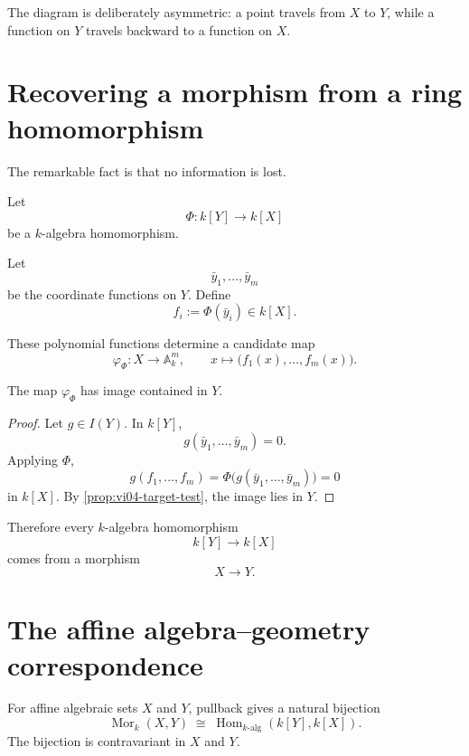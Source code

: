 \begin{center}
\end{center}

The diagram is deliberately asymmetric: a point travels from \(X\) to \(Y\), while a
function on \(Y\) travels backward to a function on \(X\).

\section{Recovering a morphism from a ring homomorphism}

The remarkable fact is that no information is lost.

Let
\[
\Phi:k[Y]\longrightarrow k[X]
\]
be a \(k\)-algebra homomorphism.

Let
\[
\bar y_1,\dots,\bar y_m
\]
be the coordinate functions on \(Y\).  Define
\[
f_i:=\Phi(\bar y_i)\in k[X].
\]

These polynomial functions determine a candidate map
\[
\varphi_\Phi:X\to\mathbb A_k^m,
\qquad
x\longmapsto
\bigl(f_1(x),\dots,f_m(x)\bigr).
\]

\begin{proposition}
\label{prop:vi04-reconstruction-lands}
The map \(\varphi_\Phi\) has image contained in \(Y\).
\end{proposition}

\begin{proof}
Let \(g\in I(Y)\).  In \(k[Y]\),
\[
g(\bar y_1,\dots,\bar y_m)=0.
\]
Applying \(\Phi\),
\[
g(f_1,\dots,f_m)
=
\Phi\bigl(g(\bar y_1,\dots,\bar y_m)\bigr)
=
0
\]
in \(k[X]\).
By \cref{prop:vi04-target-test}, the image lies in \(Y\).
\end{proof}

Therefore every \(k\)-algebra homomorphism
\[
k[Y]\to k[X]
\]
comes from a morphism
\[
X\to Y.
\]

\section{The affine algebra--geometry correspondence}

\begin{theorem}
\label{thm:vi04-affine-correspondence}
For affine algebraic sets \(X\) and \(Y\), pullback gives a natural bijection
\[
\operatorname{Mor}_k(X,Y)
\;\cong\;
\operatorname{Hom}_{k\text{-alg}}(k[Y],k[X]).
\]
The bijection is contravariant in \(X\) and \(Y\).
\end{theorem}

